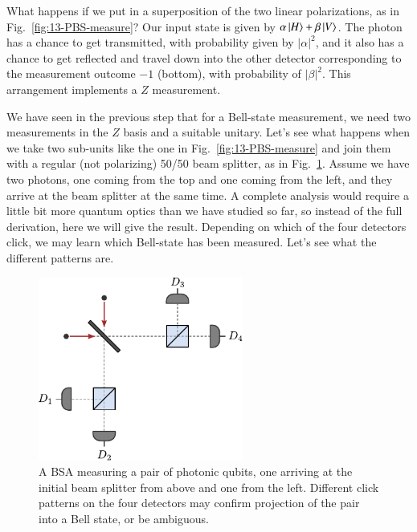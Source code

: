 What happens if we put in a superposition of the two linear polarizations, as in Fig.~\ref{fig:13-PBS-measure}?
Our input state is given by $\alpha\left| H \right\rangle + \beta \left| V \right\rangle$.
The photon has a chance to get transmitted, with probability given by $|\alpha|^2$, and it also has a chance to get reflected and travel down into the other detector corresponding to the measurement outcome $-1$ (bottom), with probability of $|\beta|^2$.
This arrangement implements a $Z$ measurement.

We have seen in the previous step that for a Bell-state measurement, we need two measurements in the $Z$ basis and a suitable unitary.
Let's see what happens when we take two sub-units like the one in Fig.~\ref{fig:13-PBS-measure} and join them with a regular (not polarizing) 50/50 beam splitter, as in Fig.~\ref{fig:13-BSA-clicks}. Assume we have two photons, one coming from the top and one coming from the left, and they arrive at the beam splitter at the same time.
A complete analysis would require a little bit more quantum optics than we have studied so far, so instead of the full derivation, here we will give the result. Depending on which of the four detectors click, we may learn which Bell-state has been measured. Let's see what the different patterns are.

\begin{figure}[t]
    \centering
    \includegraphics[width=0.6\textwidth]{lesson13/13-3_BSA_clicks.pdf}
    \caption[A four-detector Bell-state analyzer (BSA)]{A BSA measuring a pair of photonic qubits, one arriving at the initial beam splitter from above and one from the left.  Different click patterns on the four detectors may confirm projection of the pair into a Bell state, or be ambiguous.}
    \label{fig:13-BSA-clicks}
\end{figure}

